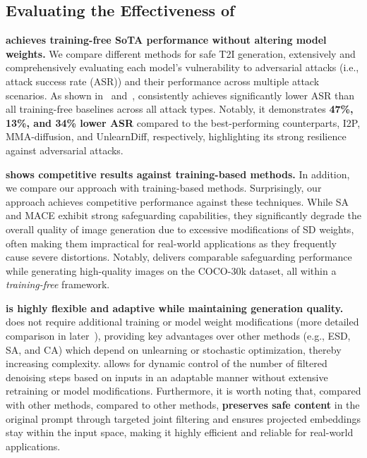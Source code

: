 \subsection{Evaluating the Effectiveness of \ours{}}
\textbf{\ours{} achieves training-free SoTA performance without altering model weights.} We compare different methods for safe T2I generation, extensively and comprehensively evaluating each model's vulnerability to adversarial attacks (i.e., attack success rate (ASR)) and their performance across multiple attack scenarios. 
As shown in~ and~, \ours{} consistently achieves significantly lower ASR than all training-free baselines across all attack types. Notably, it demonstrates \textbf{47\%, 13\%, and 34\% lower ASR} compared to the best-performing counterparts, I2P, MMA-diffusion, and UnlearnDiff, respectively, highlighting its strong resilience against adversarial attacks. 


\textbf{\ours{} shows competitive results against training-based methods.} In addition, we compare our approach with training-based methods. Surprisingly, our approach achieves competitive performance against these techniques. While SA and MACE exhibit strong safeguarding capabilities, they significantly degrade the overall quality of image generation due to excessive modifications of SD weights, often making them impractical for real-world applications as they frequently cause severe distortions. Notably, \ours{} delivers comparable safeguarding performance while generating high-quality images on the COCO-30k dataset, all within a \textit{training-free} framework.

\textbf{\ours{} is highly flexible and adaptive while maintaining generation quality.} 
\ours{} does not require additional training or model weight modifications (more detailed comparison in later~), providing key advantages over other methods (e.g., ESD, SA, and CA) which depend on unlearning or stochastic optimization, thereby increasing complexity. 
\ours{} allows for dynamic control of the number of filtered denoising steps based on inputs in an adaptable manner without extensive retraining or model modifications. 
Furthermore, it is worth noting that, compared with other methods, 
compared to other methods, \ours{} \textbf{preserves safe content} in the original prompt through targeted joint filtering and ensures projected embeddings stay within the input space, making it highly efficient and reliable for real-world applications.

